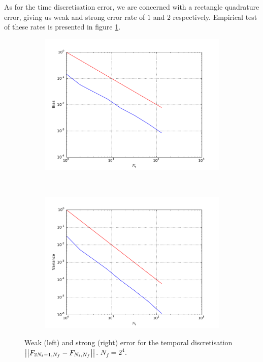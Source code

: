 \documentclass[11pt]{amsart}
\begin{document}
As for the time discretisation error, we are concerned with a rectangle quadrature
error, giving us weak and strong error rate of $1$ and $2$ respectively. Empirical
test of these rates is presented in figure \ref{img:rateFig2}.

\begin{figure}
    \centering
    \begin{subfigure}[b]{0.4\textwidth}
        \includegraphics[width=\textwidth]{weakerr2.pdf}
    \end{subfigure}
    ~ %
    \begin{subfigure}[b]{0.4\textwidth}
        \includegraphics[width=\textwidth]{strongerr2.pdf}
    \end{subfigure}
    \caption{\label{img:rateFig2} Weak (left) and strong (right) error
    for the temporal discretisation
    $\left| {\left| {{F_{2N_t-1,N_f}-F_{N_t,N_f}}} \right|} \right|_{}$. $N_f= 2^4$.}
\end{figure}
\end{document}
